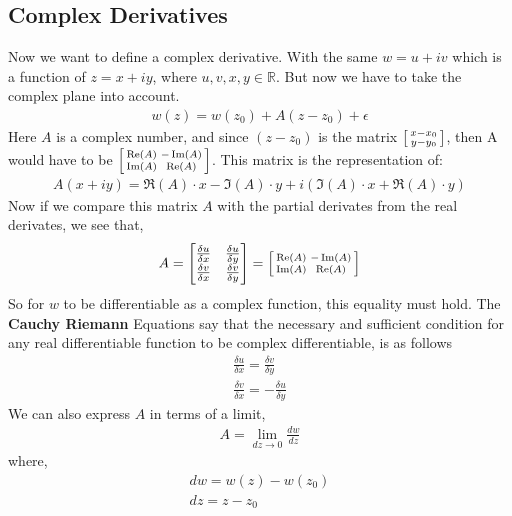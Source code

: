 \documentclass{article}
\begin{document}
\subsection{Complex Derivatives}
Now we want to define a complex derivative. With the same $w = u + iv$ which is a function of
$z = x + iy$, where $u, v, x, y \in \mathbb{R}$. But now we have to take the complex plane into
account.
\begin{gather*}
	w(z) = w(z_0) + A(z-z_0) + \epsilon
\end{gather*}
Here $A$ is a complex number, and since $(z - z_0)$ is the matrix
$
	\begin{bsmallmatrix}
		x - x_0 \\
		y - y_0
	\end{bsmallmatrix}
$, then A would have to be
$
	\begin{bsmallmatrix}
		\Re(A) & -\Im(A) \\
		\Im(A) & \Re(A)
	\end{bsmallmatrix}
$. This matrix is the representation of:
\begin{gather*}
	A(x + iy) = \Re(A) \cdot x - \Im (A) \cdot y + i (\Im(A)\cdot x + \Re(A) \cdot y)
\end{gather*}
Now if we compare this matrix $A$ with the partial derivates from the real derivates, we see that,
\begin{gather*}
	A =
	\begin{bmatrix}
		\frac{\delta u}{\delta x} & \frac{\delta u}{\delta y} \\
		\frac{\delta v}{\delta x} & \frac{\delta v}{\delta y}
	\end{bmatrix}
	=
	\begin{bsmallmatrix}
		\Re(A) & -\Im(A) \\
		\Im(A) & \Re(A)
	\end{bsmallmatrix}
\end{gather*}
So for $w$ to be differentiable as a complex function, this equality must hold. The \textbf{Cauchy Riemann}
Equations say that the necessary and sufficient condition for any real differentiable function
to be complex differentiable, is as follows
\begin{gather*}
	\frac{\delta u}{\delta x} = \frac{\delta v}{\delta y} \\
	\frac{\delta v}{\delta x} = -\frac{\delta u}{\delta y}
\end{gather*}
We can also express $A$ in terms of a limit,
\begin{gather*}
	A = \lim_{dz \rightarrow 0} \frac{dw}{dz}
\end{gather*}
where,
\begin{gather*}
	dw = w(z) - w(z_0) \\
	dz = z - z_0
\end{gather*}
\end{document}
